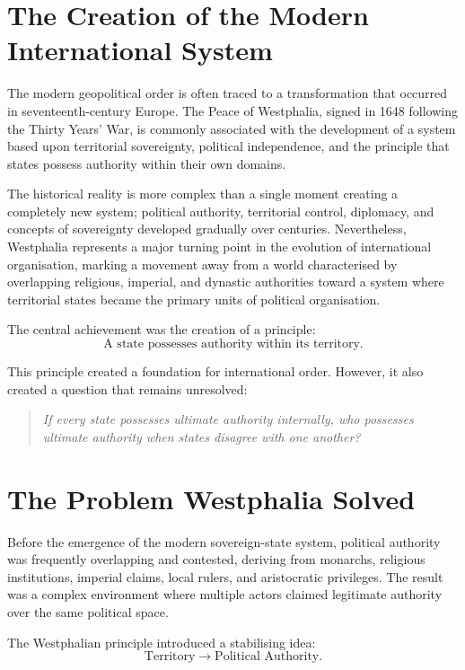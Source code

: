 \documentclass[11pt,openany]{book}
\theoremstyle{plain}
\theoremstyle{definition}
\begin{document}
\section*{The Creation of the Modern International System}

The modern geopolitical order is often traced to a transformation that occurred in seventeenth-century Europe. The Peace of Westphalia, signed in 1648 following the Thirty Years' War, is commonly associated with the development of a system based upon territorial sovereignty, political independence, and the principle that states possess authority within their own domains.

The historical reality is more complex than a single moment creating a completely new system; political authority, territorial control, diplomacy, and concepts of sovereignty developed gradually over centuries. Nevertheless, Westphalia represents a major turning point in the evolution of international organisation, marking a movement away from a world characterised by overlapping religious, imperial, and dynastic authorities toward a system where territorial states became the primary units of political organisation.

The central achievement was the creation of a principle:
\[
\boxed{
\text{A state possesses authority within its territory.}
}
\]

This principle created a foundation for international order. However, it also created a question that remains unresolved:
\begin{quote}
\textit{If every state possesses ultimate authority internally, who possesses ultimate authority when states disagree with one another?}
\end{quote}

\section*{The Problem Westphalia Solved}

Before the emergence of the modern sovereign-state system, political authority was frequently overlapping and contested, deriving from monarchs, religious institutions, imperial claims, local rulers, and aristocratic privileges. The result was a complex environment where multiple actors claimed legitimate authority over the same political space.

The Westphalian principle introduced a stabilising idea:
\[
\text{Territory}
\longrightarrow
\text{Political Authority}.
\]
\end{document}
